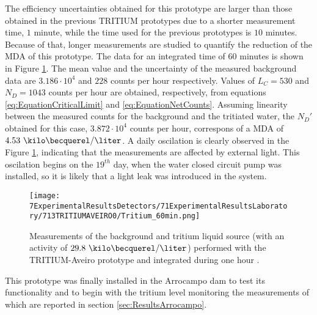 The efficiency uncertainties obtained for this prototype are larger than those obtained in the previous TRITIUM prototypes due to a shorter measurement time, $1$ minute, while the time used for the previous prototypes is $10$ minutes. Because of that, longer measurements are studied to quantify the reduction of the MDA of this prototype. The data for an integrated time of $60$ minutes is shown in Figure \ref{fig:Tritium60min}. The mean value and the uncertainty of the measured background data are $3.186 \cdot{} 10^{4}$ and $228$ counts per hour respectively. Values of $L_C=530$ and $N_D=1043$ counts per hour are obtained, respectively, from equations \ref{eq:EquationCriticalLimit} and \ref{eq:EquationNetCounts}. Assuming linearity between the measured counts for the background and the tritiated water, the $N_D'$ obtained for this case, $3.872\cdot{}10^4$ counts per hour,  correspons of a MDA of $4.53~\kilo\becquerel/\liter$. A daily oscilation is clearly observed in the Figure \ref{fig:Tritium60min}, indicating that the measurements are affected by external light. This oscilation begins on the $19^{th}$ day, when the water closed circuit pump was installed, so it is likely that a light leak was introduced in the system.

\begin{figure}[h]
\centering
\texttt{[image: 7ExperimentalResultsDetectors/71ExperimentalResultsLaboratory/713TRITIUMAVEIRO0/Tritium\_60min.png]}
\caption{Measurements of the background and tritium liquid source (with an activity of $29.8~\kilo\becquerel/\liter$) performed with the TRITIUM-Aveiro prototype and integrated during one hour \cite{ExperimentalPaperCarlos}.\label{fig:Tritium60min}}
\end{figure}

This prototype was finally installed in the Arrocampo dam to test its functionality and to begin with the tritium level monitoring the measurements of which are reported in section \ref{sec:ResultsArrocampo}.